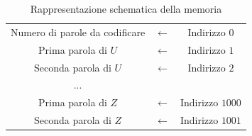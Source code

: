 \documentclass{article}
\begin{document}
\begin{table}[h]
    \centering
    \begin{tabular}{ccc}
        
        \cline{1-1}
        \multicolumn{1}{|c|}{\rule[-6.5mm]{0mm}{15mm}Numero di parole da codificare} & $\leftarrow$ & Indirizzo $0$\\
        
        \cline{1-1}
        \multicolumn{1}{|c|}{ \rule[-6.5mm]{0mm}{15mm}Prima parola di $U$} & $\leftarrow$ & Indirizzo $1$\\
        
        \cline{1-1}
        \multicolumn{1}{|c|}{ \rule[-6.5mm]{0mm}{15mm}Seconda parola di $U$} & $\leftarrow$ & Indirizzo $2$\\
        
        \cline{1-1}
        \multicolumn{1}{|c|}{ \rule[-6.5mm]{0mm}{15mm}...} &  & \\
        
        \cline{1-1}
        \multicolumn{1}{|c|}{ \rule[-6.5mm]{0mm}{15mm}Prima parola di $Z$} & $\leftarrow$ & Indirizzo $1000$\\
        
        \cline{1-1}
        \multicolumn{1}{|c|}{ \rule[-6.5mm]{0mm}{15mm}Seconda parola di $Z$} & $\leftarrow$ & Indirizzo $1001$\\
        
        \cline{1-1}
        
    \end{tabular}
    \caption{Rappresentazione schematica della memoria}
\end{table}
\end{document}
